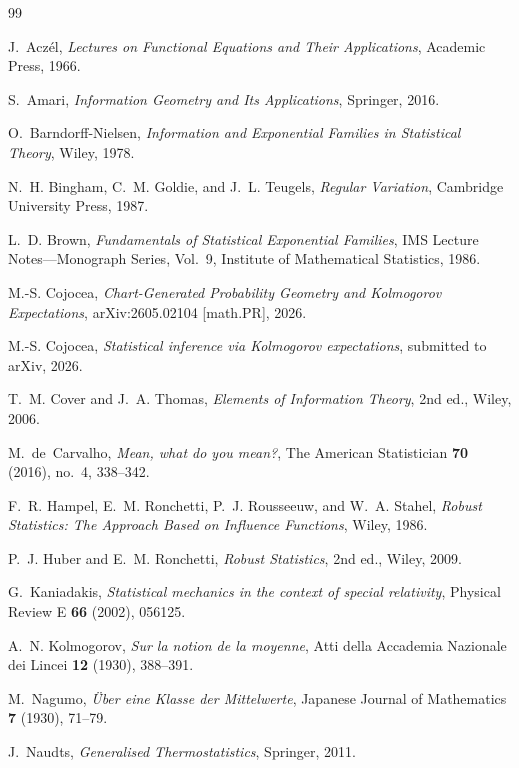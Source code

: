 \documentclass[11pt]{article}
\theoremstyle{definition}
\begin{document}
\begin{thebibliography}{99}

J.~Acz\'el,
\emph{Lectures on Functional Equations and Their Applications},
Academic Press, 1966.

S.~Amari,
\emph{Information Geometry and Its Applications},
Springer, 2016.

O.~Barndorff-Nielsen,
\emph{Information and Exponential Families in Statistical Theory},
Wiley, 1978.

N.~H. Bingham, C.~M. Goldie, and J.~L. Teugels,
\emph{Regular Variation},
Cambridge University Press, 1987.

L.~D. Brown,
\emph{Fundamentals of Statistical Exponential Families},
IMS Lecture Notes---Monograph Series, Vol.~9,
Institute of Mathematical Statistics, 1986.

M.-S. Cojocea,
\emph{Chart-Generated Probability Geometry and Kolmogorov Expectations},
arXiv:2605.02104 [math.PR], 2026.

M.-S. Cojocea,
\emph{Statistical inference via Kolmogorov expectations},
submitted to arXiv, 2026.

T.~M. Cover and J.~A. Thomas,
\emph{Elements of Information Theory}, 2nd ed.,
Wiley, 2006.

M.~de~Carvalho,
\emph{Mean, what do you mean?},
The American Statistician \textbf{70} (2016), no.~4, 338--342.

F.~R. Hampel, E.~M. Ronchetti, P.~J. Rousseeuw, and W.~A. Stahel,
\emph{Robust Statistics: The Approach Based on Influence Functions},
Wiley, 1986.

P.~J. Huber and E.~M. Ronchetti,
\emph{Robust Statistics}, 2nd ed.,
Wiley, 2009.

G.~Kaniadakis,
\emph{Statistical mechanics in the context of special relativity},
Physical Review E \textbf{66} (2002), 056125.

A.~N. Kolmogorov,
\emph{Sur la notion de la moyenne},
Atti della Accademia Nazionale dei Lincei \textbf{12} (1930), 388--391.

M.~Nagumo,
\emph{\"Uber eine Klasse der Mittelwerte},
Japanese Journal of Mathematics \textbf{7} (1930), 71--79.

J.~Naudts,
\emph{Generalised Thermostatistics},
Springer, 2011.


\end{thebibliography}
\end{document}
